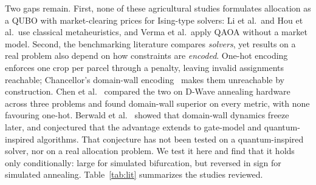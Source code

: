 \documentclass[conference,a4paper]{IEEEtran}
\begin{document}
Two gaps remain. First, none of these agricultural studies formulates
allocation as a QUBO with market-clearing prices for Ising-type solvers: Li et
al.\ and Hou et al.\ use classical metaheuristics, and Verma et al.\ apply
QAOA without a market model. Second, the benchmarking literature compares
\emph{solvers}, yet results on a real problem also depend on how constraints
are \emph{encoded}. One-hot encoding enforces one crop per parcel through a
penalty, leaving invalid assignments reachable; Chancellor's domain-wall
encoding~\cite{chancellor2019} makes them unreachable by construction. Chen et
al.~\cite{chen2021} compared the two on D-Wave annealing hardware across three
problems and found domain-wall superior on every metric, with none favouring
one-hot. Berwald et al.~\cite{berwald2022} showed that domain-wall dynamics
freeze later, and conjectured that the advantage extends to gate-model and
quantum-inspired algorithms. That conjecture has not been tested on a
quantum-inspired solver, nor on a real allocation problem. We test it here and
find that it holds only conditionally: large for simulated bifurcation, but
reversed in sign for simulated annealing. Table~\ref{tab:lit} summarizes the
studies reviewed.
\end{document}
